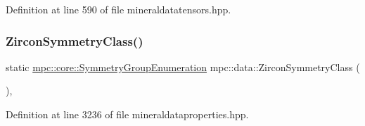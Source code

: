 Definition at line 590 of file mineraldatatensors.\+hpp.

\mbox{\label{namespacempc_1_1data_ad4ffddb1bd1cb59ed7a259e300176198}} 
\subsubsection{\texorpdfstring{Zircon\+Symmetry\+Class()}{ZirconSymmetryClass()}}
{\footnotesize\ttfamily static \mbox{\hyperlink{namespacempc_1_1core_a9d979684062547055a0ef5c13077bad8}{mpc\+::core\+::\+Symmetry\+Group\+Enumeration}} mpc\+::data\+::\+Zircon\+Symmetry\+Class (\begin{DoxyParamCaption}{ }\end{DoxyParamCaption})\hspace{0.3cm}{\ttfamily [inline]}, {\ttfamily [static]}}



Definition at line 3236 of file mineraldataproperties.\+hpp.

